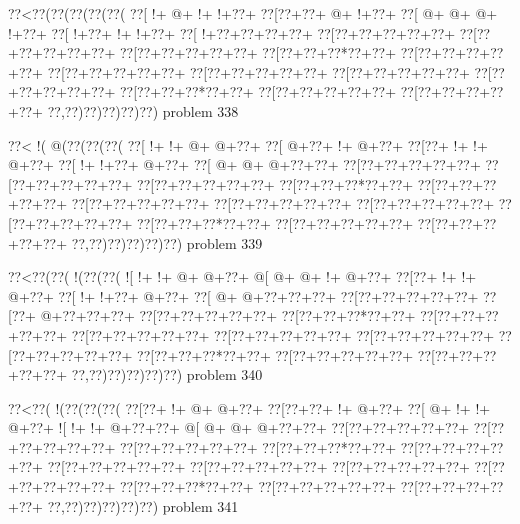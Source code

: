 \vbox{\vbox{\goo
\0??<\0??(\0??(\0??(\0??(\0??(
\0??[\- !+\- @+\- !+\- !+\0??+
\0??[\0??+\0??+\- @+\- !+\0??+
\0??[\- @+\- @+\- @+\- !+\0??+
\0??[\- !+\0??+\- !+\- !+\0??+
\0??[\- !+\0??+\0??+\0??+\0??+
\0??[\0??+\0??+\0??+\0??+\0??+
\0??[\0??+\0??+\0??+\0??+\0??+
\0??[\0??+\0??+\0??+\0??+\0??+
\0??[\0??+\0??+\0??*\0??+\0??+
\0??[\0??+\0??+\0??+\0??+\0??+
\0??[\0??+\0??+\0??+\0??+\0??+
\0??[\0??+\0??+\0??+\0??+\0??+
\0??[\0??+\0??+\0??+\0??+\0??+
\0??[\0??+\0??+\0??+\0??+\0??+
\0??[\0??+\0??+\0??*\0??+\0??+
\0??[\0??+\0??+\0??+\0??+\0??+
\0??[\0??+\0??+\0??+\0??+\0??+
\0??,\0??)\0??)\0??)\0??)\0??)
}
\hfil problem 338\hfil\break
}

\vbox{\vbox{\goo
\0??<\- !(\- @(\0??(\0??(\0??(
\0??[\- !+\- !+\- @+\- @+\0??+
\0??[\- @+\0??+\- !+\- @+\0??+
\0??[\0??+\- !+\- !+\- @+\0??+
\0??[\- !+\- !+\0??+\- @+\0??+
\0??[\- @+\- @+\- @+\0??+\0??+
\0??[\0??+\0??+\0??+\0??+\0??+
\0??[\0??+\0??+\0??+\0??+\0??+
\0??[\0??+\0??+\0??+\0??+\0??+
\0??[\0??+\0??+\0??*\0??+\0??+
\0??[\0??+\0??+\0??+\0??+\0??+
\0??[\0??+\0??+\0??+\0??+\0??+
\0??[\0??+\0??+\0??+\0??+\0??+
\0??[\0??+\0??+\0??+\0??+\0??+
\0??[\0??+\0??+\0??+\0??+\0??+
\0??[\0??+\0??+\0??*\0??+\0??+
\0??[\0??+\0??+\0??+\0??+\0??+
\0??[\0??+\0??+\0??+\0??+\0??+
\0??,\0??)\0??)\0??)\0??)\0??)
}
\hfil problem 339\hfil\break
}

\vbox{\vbox{\goo
\0??<\0??(\0??(\- !(\0??(\0??(
\- ![\- !+\- !+\- @+\- @+\0??+
\- @[\- @+\- @+\- !+\- @+\0??+
\0??[\0??+\- !+\- !+\- @+\0??+
\0??[\- !+\- !+\0??+\- @+\0??+
\0??[\- @+\- @+\0??+\0??+\0??+
\0??[\0??+\0??+\0??+\0??+\0??+
\0??[\0??+\- @+\0??+\0??+\0??+
\0??[\0??+\0??+\0??+\0??+\0??+
\0??[\0??+\0??+\0??*\0??+\0??+
\0??[\0??+\0??+\0??+\0??+\0??+
\0??[\0??+\0??+\0??+\0??+\0??+
\0??[\0??+\0??+\0??+\0??+\0??+
\0??[\0??+\0??+\0??+\0??+\0??+
\0??[\0??+\0??+\0??+\0??+\0??+
\0??[\0??+\0??+\0??*\0??+\0??+
\0??[\0??+\0??+\0??+\0??+\0??+
\0??[\0??+\0??+\0??+\0??+\0??+
\0??,\0??)\0??)\0??)\0??)\0??)
}
\hfil problem 340\hfil\break
}

\vbox{\vbox{\goo
\0??<\0??(\- !(\0??(\0??(\0??(
\0??[\0??+\- !+\- @+\- @+\0??+
\0??[\0??+\0??+\- !+\- @+\0??+
\0??[\- @+\- !+\- !+\- @+\0??+
\- ![\- !+\- !+\- @+\0??+\0??+
\- @[\- @+\- @+\- @+\0??+\0??+
\0??[\0??+\0??+\0??+\0??+\0??+
\0??[\0??+\0??+\0??+\0??+\0??+
\0??[\0??+\0??+\0??+\0??+\0??+
\0??[\0??+\0??+\0??*\0??+\0??+
\0??[\0??+\0??+\0??+\0??+\0??+
\0??[\0??+\0??+\0??+\0??+\0??+
\0??[\0??+\0??+\0??+\0??+\0??+
\0??[\0??+\0??+\0??+\0??+\0??+
\0??[\0??+\0??+\0??+\0??+\0??+
\0??[\0??+\0??+\0??*\0??+\0??+
\0??[\0??+\0??+\0??+\0??+\0??+
\0??[\0??+\0??+\0??+\0??+\0??+
\0??,\0??)\0??)\0??)\0??)\0??)
}
\hfil problem 341\hfil\break
}

